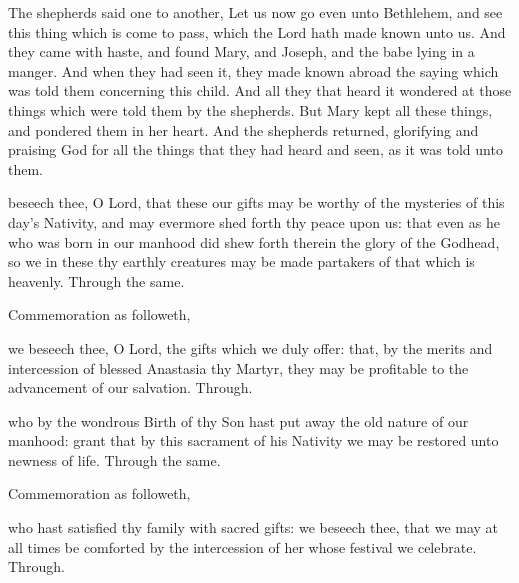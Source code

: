 
 The shepherds said one to another, Let us now go even unto Bethlehem, and see this thing which is come to pass, which the Lord hath made known unto us. And they came with haste, and found Mary, and Joseph, and the babe lying in a manger. And when they had seen it, they made known abroad the saying which was told them concerning this child. And all they that heard it wondered at those things which were told them by the shepherds. But Mary kept all these things, and pondered them in her heart. And the shepherds returned, glorifying and praising God for all the things that they had heard and seen, as it was told unto them.


\secret
{} beseech thee, O Lord, that these our gifts may be worthy of the mysteries of this day's Nativity, and may evermore shed forth thy peace upon us: that even as he who was born in our manhood did shew forth therein the glory of the Godhead, so we in these thy earthly creatures may be made partakers of that which is heavenly. Through the same.
\begin{rubric}
	Commemoration  as followeth,
\end{rubric}
 we beseech thee, O Lord, the gifts which we duly offer: that, by the merits and intercession of blessed Anastasia thy Martyr, they may be profitable to the advancement of our salvation. Through.


\clearpage
\postcommunion
{} who by the wondrous Birth of thy Son hast put away the old nature of our manhood: grant that by this sacrament of his Nativity we may be restored unto newness of life. Through the same.
\begin{rubric}
	Commemoration  as followeth,
\end{rubric}
 who hast satisfied thy family with sacred gifts: we beseech thee, that we may at all times be comforted by the intercession of her whose festival we celebrate. Through.


